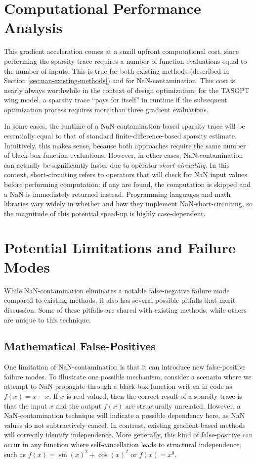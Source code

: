 \documentclass{article}
\begin{document}
\section{Computational Performance Analysis}
\label{sec:speed}

This gradient acceleration comes at a small upfront computational cost, since performing the sparsity trace requires a number of function evaluations equal to the number of inputs. This is true for both existing methods (described in Section \ref{sec:nan-existing-methods}) and for NaN-contamination. This cost is nearly always worthwhile in the context of design optimization: for the TASOPT wing model, a sparsity trace ``pays for itself'' in runtime if the subsequent optimization process requires more than three gradient evaluations.

In some cases, the runtime of a NaN-contamination-based sparsity trace will be essentially equal to that of standard finite-difference-based sparsity estimate. Intuitively, this makes sense, because both approaches require the same number of black-box function evaluations. However, in other cases, NaN-contamination can actually be significantly faster due to operator \emph{short-circuiting}. In this context, short-circuiting refers to operators that will check for NaN input values before performing computation; if any are found, the computation is skipped and a NaN is immediately returned instead. Programming languages and math libraries vary widely in whether and how they implement NaN-short-circuiting, so the magnitude of this potential speed-up is highly case-dependent.


\section{Potential Limitations and Failure Modes}
\label{sec:limitations}

While NaN-contamination eliminates a notable false-negative failure mode compared to existing methods, it also has several possible pitfalls that merit discussion. Some of these pitfalls are shared with existing methods, while others are unique to this technique.

\subsection{Mathematical False-Positives}

One limitation of NaN-contamination is that it can introduce new false-positive failure modes. To illustrate one possible mechanism, consider a scenario where we attempt to NaN-propagate through a black-box function written in code as $f(x)= x - x$. If $x$ is real-valued, then the correct result of a sparsity trace is that the input $x$ and the output $f(x)$ are structurally unrelated. However, a NaN-contamination technique will indicate a possible dependency here, as NaN values do not subtractively cancel. In contrast, existing gradient-based methods will correctly identify independence. More generally, this kind of false-positive can occur in any function where self-cancellation leads to structural independence, such as $f(x) = \sin(x)^2 + \cos(x)^2$ or $f(x) = x^0$.
\end{document}
